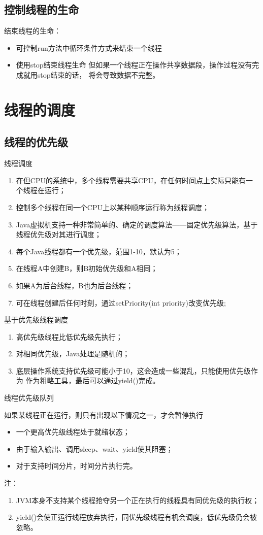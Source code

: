 \subsection{控制线程的生命}
结束线程的生命：
\begin{itemize}
	\item 可控制run方法中循环条件方式来结束一个线程
	\item 使用stop结束线程生命
	\subitem 但如果一个线程正在操作共享数据段，操作过程没有完成就用stop结束的话，
	将会导致数据不完整。
\end{itemize}
\section{线程的调度}
\subsection{线程的优先级}
线程调度
\begin{enumerate}
	\item 在但CPU的系统中，多个线程需要共享CPU，在任何时间点上实际只能有一个线程在运行；
	\item 控制多个线程在同一个CPU上以某种顺序运行称为线程调度；
	\item Java虚拟机支持一种非常简单的、确定的调度算法——固定优先级算法，基于线程优先级对其进行调度；
	\item 每个Java线程都有一个优先级，范围1-10，默认为5；
	\item 在线程A中创建B，则B初始优先级和A相同；
	\item 如果A为后台线程，B也为后台线程；
	\item 可在线程创建后任何时刻，通过setPriority(int priority)改变优先级;
\end{enumerate}
\par 基于优先级线程调度
\begin{enumerate}
	\item 高优先级线程比低优先级先执行；
	\item 对相同优先级，Java处理是随机的；
	\item 底层操作系统支持优先级可能小于10，这会造成一些混乱，只能使用优先级作为
	作为粗略工具，最后可以通过yield()完成。
\end{enumerate}
\par 线程优先级队列
\par 如果某线程正在运行，则只有出现以下情况之一，才会暂停执行
\begin{itemize}
	\item 一个更高优先级线程处于就绪状态；
	\item 由于输入输出、调用sleep、wait、yield使其阻塞；
	\item 对于支持时间分片，时间分片执行完。
\end{itemize}
\par 注：
\begin{enumerate}
	\item JVM本身不支持某个线程抢夺另一个正在执行的线程具有同优先级的执行权；
	\item yield()会使正运行线程放弃执行，同优先级线程有机会调度，低优先级仍会被忽略。
\end{enumerate}